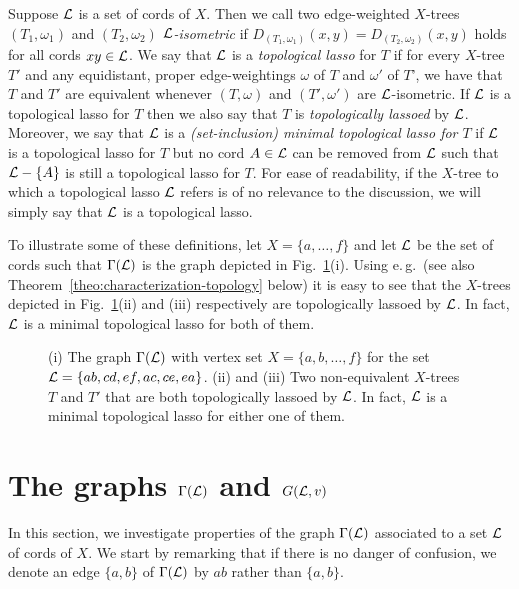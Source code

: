 Suppose ${\mathcal L}$ is a set of cords of $X$. Then  
we call two edge-weighted $X$-trees 
$(T_1,\omega_1)$ and $(T_2,\omega_2)$  {\em ${\mathcal L}$-isometric} if 
$D_{(T_1,\omega_1)}(x,y)=D_{(T_2,\omega_2)}(x,y)$ 
holds for all cords $xy\in {\mathcal L}$. We say that ${\mathcal L}$ is
a  {\em topological lasso} for $T$ if for every $X$-tree $T'$ and
any equidistant, proper edge-weightings $\omega$ of $T$ and $\omega'$ of
$T$',  we have that $T$ and $T'$ are equivalent
whenever $(T,\omega)$ and  $(T',\omega')$ are ${\mathcal L}$-isometric.
If ${\mathcal L}$ is a topological lasso for $T$ then we also say that $T$ is 
{\em topologically lassoed} by ${\mathcal L}$. Moreover, 
we say that ${\mathcal L}$ is  a {\em (set-inclusion) minimal topological 
lasso for $T$} if 
${\mathcal L}$ is a topological lasso for $T$ but no cord $A\in {\mathcal L}$
can be removed from ${\mathcal L}$ such that ${\mathcal L}-\{A\}$ is still a
topological lasso for $T$. 
For ease of readability, if the $X$-tree to which a
topological lasso ${\mathcal L}$ refers is of no relevance
to the discussion, we will simply say that ${\mathcal L}$ is a 
topological lasso. 

To illustrate some of these definitions, let $X=\{a,\ldots, f\}$ and
let ${\mathcal L}$ be the set of cords such that $\Gamma({\mathcal L})$ is the
graph depicted in Fig.~\ref{fig:block-graph-motivation}(i).
Using e.\,g.\,\cite[Theorem~7.1]{HP13} (see also 
Theorem~\ref{theo:characterization-topology} below)
it is easy to see that the $X$-trees depicted in
Fig.~\ref{fig:block-graph-motivation}(ii) and (iii) respectively
are topologically lassoed by ${\mathcal L}$. In fact, ${\mathcal L}$ is a minimal 
topological lasso for both of them.
\begin{figure}[h]
\begin{center}

\end{center}
\caption{\label{fig:block-graph-motivation}
(i) The graph $\Gamma({\mathcal L})$ with vertex set $X=\{a,b,\ldots,f\}$
for the set ${\mathcal L}=\{ab,cd,ef,ac,ce,ea\}$. (ii) and (iii)
Two non-equivalent $X$-trees $T$ and $T'$
that are both topologically lassoed by ${\mathcal L}$. In fact, 
${\mathcal L}$ is a minimal topological lasso for either one of them.
}
\end{figure}


\section{The graphs $\Gamma({\mathcal L})$ and 
$G({\mathcal L},v)$}\label{sec:gamma-l-graph}


In this section, we investigate properties of the graph $\Gamma({\mathcal L})$ 
associated to a %
set ${\mathcal L}$ of cords of $X$. We start by remarking  that
if there is no danger of confusion, we denote an edge 
$\{a,b\}$ of $\Gamma({\mathcal L})$ by $ab$ rather than $\{a,b\}$.

